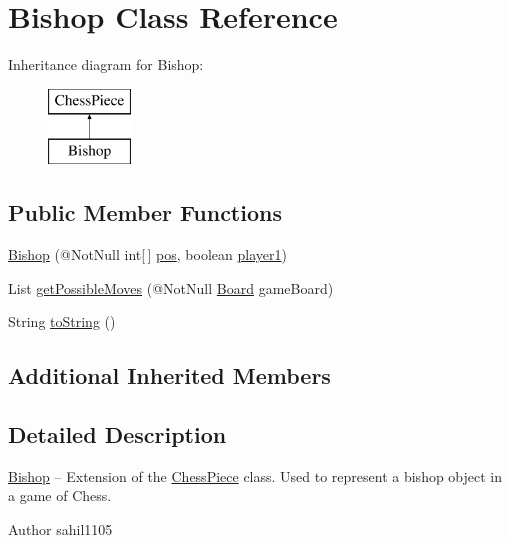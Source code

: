 \hypertarget{class_bishop}{}\section{Bishop Class Reference}
\label{class_bishop}
Inheritance diagram for Bishop\+:\begin{figure}[H]
\begin{center}
\leavevmode
\includegraphics[height=2.000000cm]{class_bishop}
\end{center}
\end{figure}
\subsection*{Public Member Functions}
\begin{DoxyCompactItemize}
\item 
\mbox{\hyperlink{class_bishop_a08973295c3ebc313a9f767b74c3cb276}{Bishop}} (@Not\+Null int\mbox{[}$\,$\mbox{]} \mbox{\hyperlink{class_chess_piece_ae9f0da2b5fca2557eab359044a7ba1ac}{pos}}, boolean \mbox{\hyperlink{class_chess_piece_aa8711ff5ce8a45159b9b30c8148a34b2}{player1}})
\item 
List \mbox{\hyperlink{class_bishop_a168bf9e524e798efb1d313fcd4a34e59}{get\+Possible\+Moves}} (@Not\+Null \mbox{\hyperlink{class_board}{Board}} game\+Board)
\item 
String \mbox{\hyperlink{class_bishop_af8fef6f201eda44ed2a36bd1f1775c26}{to\+String}} ()
\end{DoxyCompactItemize}
\subsection*{Additional Inherited Members}


\subsection{Detailed Description}
\mbox{\hyperlink{class_bishop}{Bishop}} -- Extension of the \mbox{\hyperlink{class_chess_piece}{Chess\+Piece}} class. Used to represent a bishop object in a game of Chess. \begin{DoxyAuthor}{Author}
sahil1105 
\end{DoxyAuthor}


